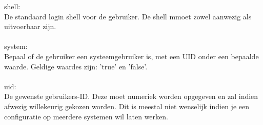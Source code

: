 %
shell:\\
De standaard login shell voor de gebruiker. De shell mmoet zowel aanwezig als uitvoerbaar zijn.\\\\
%
system:\\
Bepaal of de gebruiker een systeemgebruiker is, met een UID onder een bepaalde waarde. Geldige waardes zijn: 'true' en 'false'.\\\\
%
uid:\\
De gewenste gebruikers-ID. Deze moet numeriek worden opgegeven en zal indien afwezig willekeurig gekozen worden. Dit is meestal niet wenselijk indien je een configuratie op meerdere systemen wil laten werken.\\\\
